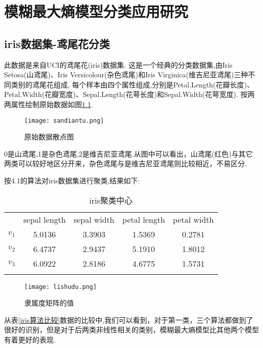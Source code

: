 \chapter{模糊最大熵模型分类应用研究}

\section{iris数据集-鸢尾花分类}
\par
此数据是来自UCI的鸢尾花(iris)数据集.
这是一个经典的分类数据集,由Iris Setosa(山鸢尾)、Iris Versicolour(杂色鸢尾)和Iris Virginica(维吉尼亚鸢尾)三种不同类别的鸢尾花组成,
每个样本由四个属性组成,分别是Petal.Length(花瓣长度)、Petal.Width(花瓣宽度)、Sepal.Length(花萼长度)和Sepal.Width(花萼宽度).
按两两属性绘制原始数据如图\ref{散点图}.
\begin{figure}[!ht]
    \centering
    \texttt{[image: sandiantu.png]}
    \caption{原始数据散点图}
    \label{散点图}
\end{figure}
\par
0是山鸢尾,1是杂色鸢尾,2是维吉尼亚鸢尾.从图中可以看出，山鸢尾(红色)与其它两类可以较好地区分开来，杂色鸢尾与是维吉尼亚鸢尾则比较相近，不易区分.
\par 按4.1的算法对iris数据集进行聚类,结果如下:\\
\begin{table}[!ht]
    \label{iris聚类中心}
    \caption{iris聚类中心}
    \centering
    \begin{tabular}{c c c c c}
        \whline & sepal length & sepal width & petal length & petal width \\\whline
        $v_1$   & 5.0136       & 3.3903      & 1.5369       & 0.2781      \\
        $v_2$   & 6.4737       & 2.9437      & 5.1910       & 1.8012      \\
        $v_3$   & 6.0922       & 2.8186      & 4.6775       & 1.5731      \\
        \whline
    \end{tabular}
\end{table}
\newpage
\begin{figure}[!ht]
    \centering
    \texttt{[image: lishudu.png]}
    \caption{隶属度矩阵的值}
    \label{隶属度}
\end{figure}
从表\ref{iris算法比较}数据的比较中,我们可以看到，对于第一类，三个算法都做到了很好的识别，但是对于后两类非线性相关的类别，模糊最大熵模型比其他两个模型有着更好的表现.
